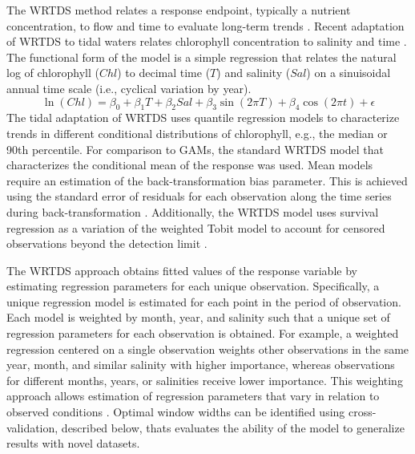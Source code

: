 \documentclass[letterpaper,12pt,oneside]{article}\usepackage[]{graphicx}\usepackage[]{color}
\begin{document}
The \ac{WRTDS} method relates a response endpoint, typically a nutrient concentration, to flow and time to evaluate long-term trends \citep{Hirsch10,Hirsch14}. Recent adaptation of \ac{WRTDS} to tidal waters relates chlorophyll concentration to salinity and time \citep{Beck15}.  The functional form of the model is a simple regression that relates the natural log of chlorophyll ($Chl$) to decimal time ($T$) and salinity ($Sal$) on a sinuisoidal annual time scale (i.e., cyclical variation by year). 
\begin{equation} \label{eqn:funform}
\ln\left(Chl\right) = \beta_0 + \beta_1 T + \beta_2 Sal + \beta_3 \sin\left(2\pi T\right) + \beta_4 \cos\left(2\pi t\right) + \epsilon
\end{equation}
The tidal adaptation of \ac{WRTDS} uses quantile regression models \citep{Cade03} to characterize trends in different conditional distributions of chlorophyll, e.g., the median or 90th percentile. For comparison to \acp{GAM}, the standard \ac{WRTDS} model that characterizes the conditional mean of the response was used.  Mean models require an estimation of the back-transformation bias parameter. This is achieved using the standard error of residuals for each observation along the time series during back-transformation \citep{Hirsch10}.  Additionally, the \ac{WRTDS} model uses survival regression as a variation of the weighted Tobit model \citep{Tobin58} to account for censored observations beyond the detection limit \citep{Hirsch14}.

The \ac{WRTDS} approach obtains fitted values of the response variable by estimating regression parameters for each unique observation. Specifically, a unique regression model is estimated for each point in the period of observation. Each model is weighted by month, year, and salinity such that a unique set of regression parameters for each observation is obtained. For example, a weighted regression centered on a single observation weights other observations in the same year, month, and similar salinity with higher importance, whereas observations for different months, years, or salinities receive lower importance. This weighting approach allows estimation of regression parameters that vary in relation to observed conditions \citep{Hirsch10}. Optimal window widths can be identified using cross-validation, described below, thats evaluates the ability of the model to generalize results with novel datasets.
\end{document}

